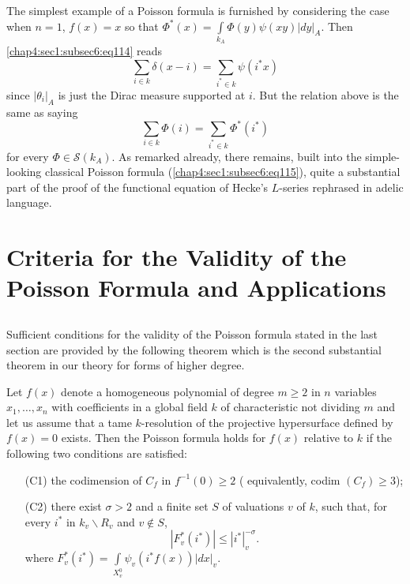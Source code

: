The simplest example of a Poisson formula is furnished by considering
the case when $n=1$, $f(x)=x$ so that
$\Phi^{\ast}(x)=\int\limits_{k_{A}}\Phi(y)\psi(xy)|dy|_{A}$. Then
\ref{chap4:sec1:subsec6:eq114} reads
$$
\sum_{i\in k}\delta(x-i)=\sum_{i^{\ast}\in k}\psi(i^{\ast}x)
$$
since $|\theta_{i}|_{A}$ is just the Dirac measure supported at
$i$. But the relation above is the same as saying
\begin{equation*}
  \sum_{i\in k}\Phi(i)=\sum_{i^{\ast}\in
    k}\Phi^{\ast}(i^{\ast})\tag{115}\label{chap4:sec1:subsec6:eq115}
\end{equation*}
for every $\Phi\in \mathscr{S}(k_{A})$. As remarked already, there
remains, built into the simple-looking classical Poisson formula
(\ref{chap4:sec1:subsec6:eq115}), quite a substantial part of the proof of\pageoriginale
the functional equation of Hecke's $L$-series rephrased in adelic
language.

\section[Criteria for the Validity of the...]{Criteria for the Validity of the Poisson Formula and
  Applications}\label{chap4:sec2}%

\subsection{}\label{chap4:sec2:subsec1} %

Sufficient conditions for the validity of the Poisson formula stated
in the last section are provided by the following theorem which is the
second substantial theorem in our theory for forms of higher degree.

\begin{theorem}\label{chap4:sec2:subsec1:thm1} %
  Let $f(x)$ denote a homogeneous polynomial of degree $m\geq 2$ in $n$
  variables $x_{1},\ldots,x_{n}$ with coefficients in a global field $k$
  of characteristic not dividing $m$ and let us assume that a tame
  $k$-resolution of the projective hypersurface defined by $f(x)=0$
  exists. Then the Poisson formula holds for $f(x)$ relative to $k$ if
  the following two conditions are satisfied:
  \begin{itemize}
  \item[\rm(C1)] the codimension of $C_{f}$ in $f^{-1}(0)\geq 2$ (\ie
    equivalently, codim $(C_{f})\geq 3$);
  \item[\rm(C2)] there exist $\sigma>2$ and a finite set $S$ of valuations
    $v$ of $k$, such that, for every $i^{\ast}$ in $k_{v}\backslash
    R_{v}$ and $v\not\in S$,
    $$
    |F^{\ast}_{v}(i^{\ast})|\leq |i^{\ast}|^{-\sigma}_{v}.
    $$
    where
    $F^{\ast}_{v}(i^{\ast})=\int\limits_{X^{0}_{v}}\psi_{v}
    (i^{\ast}f(x))|dx|_{v}$.  
  \end{itemize}
\end{theorem}

